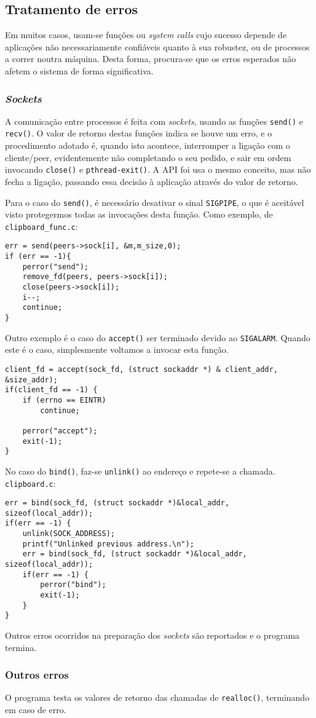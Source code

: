 \documentclass{article}
\begin{document}
\subsection{Tratamento de erros}

Em muitos casos, usam-se funções ou \textit{system calls} cujo sucesso depende de aplicações não necessariamente confiáveis quanto à sua robustez, ou de processos a correr noutra máquina. 
Desta forma, procura-se que os erros esperados não afetem o sistema de forma significativa. 

\subsubsection{\textit{Sockets}}

A comunicação entre processos é feita com \textit{sockets}, usando as funções \texttt{send()} e \texttt{recv()}. 
O valor de retorno destas funções indica se houve um erro, e o procedimento adotado é, quando isto acontece, interromper a ligação com o cliente/peer, evidentemente não completando o seu pedido, e sair em ordem invocando \texttt{close()} e \texttt{pthread-exit()}.
A API foi usa o mesmo conceito, mas não fecha a ligação, passando essa decisão à aplicação através do valor de retorno.

Para o caso do \texttt{send()}, é necessário desativar o sinal \texttt{SIGPIPE}, o que é aceitável visto protegermos todas as invocações desta função. Como exemplo, de \texttt{clipboard\_func.c}:

\begin{verbatim}
err = send(peers->sock[i], &m,m_size,0);
if (err == -1){
	perror("send");
	remove_fd(peers, peers->sock[i]);
	close(peers->sock[i]);
	i--;
	continue;
}
\end{verbatim}

Outro exemplo é o caso do \texttt{accept()} ser terminado devido ao \texttt{SIGALARM}. Quando este é o caso, simplesmente voltamos a invocar esta função.
\begin{verbatim}
client_fd = accept(sock_fd, (struct sockaddr *) & client_addr, &size_addr);
if(client_fd == -1) {
	if (errno == EINTR)
		continue;
				
	perror("accept");
	exit(-1);
}
\end{verbatim}

No caso do \texttt{bind()}, faz-se \texttt{unlink()} ao endereço e repete-se a chamada. \texttt{clipboard.c}:
\begin{verbatim}
err = bind(sock_fd, (struct sockaddr *)&local_addr, sizeof(local_addr));
if(err == -1) {
	unlink(SOCK_ADDRESS);
	printf("Unlinked previous address.\n");
	err = bind(sock_fd, (struct sockaddr *)&local_addr, sizeof(local_addr));
	if(err == -1) {
		perror("bind");
		exit(-1);
	}
}
\end{verbatim}

Outros erros ocorridos na preparação dos \textit{sockets} são reportados e o programa termina.

\subsubsection{Outros erros}

O programa testa os valores de retorno das chamadas de \texttt{realloc()}, terminando em caso de erro.
\end{document}
